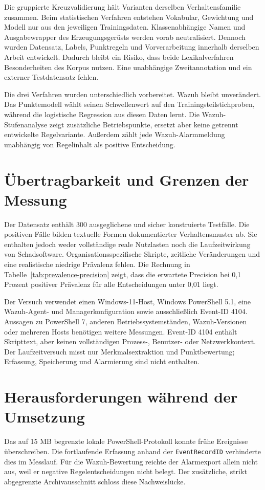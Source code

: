 \documentclass[12pt,a4paper,oneside,parskip=half]{scrreprt}
\begin{document}
Die gruppierte Kreuzvalidierung hält Varianten derselben Verhaltensfamilie zusammen. Beim statistischen Verfahren entstehen Vokabular, Gewichtung und Modell nur aus den jeweiligen Trainingsdaten. Klassenabhängige Namen und Ausgabewrapper des Erzeugungsgerüsts werden vorab neutralisiert. Dennoch wurden Datensatz, Labels, Punktregeln und Vorverarbeitung innerhalb derselben Arbeit entwickelt. Dadurch bleibt ein Risiko, dass beide Lexikalverfahren Besonderheiten des Korpus nutzen. Eine unabhängige Zweitannotation und ein externer Testdatensatz fehlen.

Die drei Verfahren wurden unterschiedlich vorbereitet. Wazuh bleibt unverändert. Das Punktemodell wählt seinen Schwellenwert auf den Trainingsteilstichproben, während die logistische Regression aus diesen Daten lernt. Die Wazuh-Stufenanalyse zeigt zusätzliche Betriebspunkte, ersetzt aber keine getrennt entwickelte Regelvariante. Außerdem zählt jede Wazuh-Alarmmeldung unabhängig von Regelinhalt als positive Entscheidung.

\section{Übertragbarkeit und Grenzen der Messung}
Der Datensatz enthält 300 ausgeglichene und sicher konstruierte Testfälle. Die positiven Fälle bilden textuelle Formen dokumentierter Verhaltensmuster ab. Sie enthalten jedoch weder vollständige reale Nutzlasten noch die Laufzeitwirkung von Schadsoftware. Organisationsspezifische Skripte, zeitliche Veränderungen und eine realistische niedrige Prävalenz fehlen. Die Rechnung in Tabelle~\ref{tab:prevalence-precision} zeigt, dass die erwartete Precision bei 0{,}1 Prozent positiver Prävalenz für alle Entscheidungen unter 0{,}01 liegt.

Der Versuch verwendet einen Windows-11-Host, Windows PowerShell 5.1, eine Wazuh-Agent- und Managerkonfiguration sowie ausschließlich Event-ID 4104. Aussagen zu PowerShell 7, anderen Betriebssystemständen, Wazuh-Versionen oder mehreren Hosts benötigen weitere Messungen. Event-ID 4104 enthält Skripttext, aber keinen vollständigen Prozess-, Benutzer- oder Netzwerkkontext. Der Laufzeitversuch misst nur Merkmalsextraktion und Punktbewertung; Erfassung, Speicherung und Alarmierung sind nicht enthalten.

\section{Herausforderungen während der Umsetzung}
Das auf 15 MB begrenzte lokale PowerShell-Protokoll konnte frühe Ereignisse überschreiben. Die fortlaufende Erfassung anhand der \texttt{EventRecordID} verhinderte dies im Messlauf. Für die Wazuh-Bewertung reichte der Alarmexport allein nicht aus, weil er negative Regelentscheidungen nicht belegt. Der zusätzliche, strikt abgegrenzte Archivausschnitt schloss diese Nachweislücke.
\end{document}
